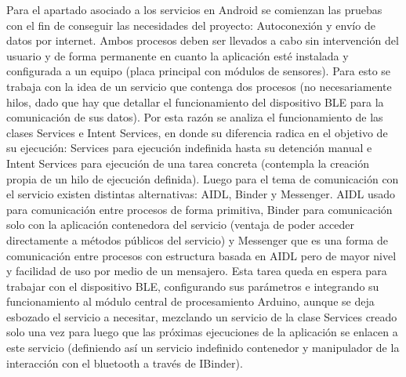 Para el apartado asociado a los servicios en Android se comienzan las pruebas con el fin de conseguir las necesidades del proyecto: Autoconexión y envío de datos por internet. Ambos procesos deben ser llevados a cabo sin intervención del usuario y de forma permanente en cuanto la aplicación esté instalada y configurada a un equipo (placa principal con módulos de sensores). \newline
Para esto se trabaja con la idea de un servicio que contenga dos procesos (no necesariamente hilos, dado que hay que detallar el funcionamiento del dispositivo BLE para la comunicación de sus datos). Por esta razón se analiza el funcionamiento de las clases Services e Intent Services, en donde su diferencia radica en el objetivo de su ejecución: Services para ejecución indefinida hasta su detención manual e Intent Services para ejecución de una tarea concreta (contempla la creación propia de un hilo de ejecución definida). Luego para el tema de comunicación con el servicio existen distintas alternativas: AIDL, Binder y Messenger. AIDL usado para comunicación entre procesos de forma primitiva, Binder para comunicación solo con la aplicación contenedora del servicio (ventaja de poder acceder directamente a métodos públicos del servicio) y Messenger que es una forma de comunicación entre procesos con estructura basada en AIDL pero de mayor nivel y facilidad de uso por medio de un mensajero. Esta tarea queda en espera para trabajar con el dispositivo BLE, configurando sus parámetros e integrando su funcionamiento al módulo central de procesamiento Arduino, aunque se deja esbozado el servicio a necesitar, mezclando un servicio de la clase Services creado solo una vez para luego que las próximas ejecuciones de la aplicación se enlacen a este servicio (definiendo así un servicio indefinido contenedor y manipulador de la interacción con el bluetooth a través de IBinder).


